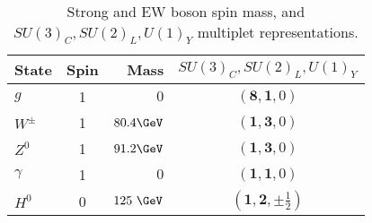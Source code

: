 \begin{table}[!htp]
\centering
\small
\begin{tabular}{|lcrc|}
\hline
State  & Spin & Mass &  $SU(3)_{C}, SU(2)_{L}, U(1)_{Y}$ \\
\hline \hline
$g$ & 1&  $0$ & $(\mathbf{8}, \mathbf{1}, 0)$ \\ 
\hline
$W^\pm$ & 1 & $80.4\GeV$ & $(\mathbf{1}, \mathbf{3}, 0)$  \\  
$Z^0$ & 1 & $91.2\GeV$ & $(\mathbf{1}, \mathbf{3}, 0)$\\ 
$\gamma$ & 1 & $0$ & $(\mathbf{1}, \mathbf{1}, 0)$ \\  
\hline
$H^0$& 0 & $125~\GeV$&$(\mathbf{1}, \mathbf{2}, \pm\frac{1}{2})$\\
\hline 

\hline
\end{tabular}
\caption{Strong and EW boson spin mass, and $SU(3)_{C}, SU(2)_{L}, U(1)_{Y}$ multiplet representations. }
\label{tab:boson}
\end{table} 

